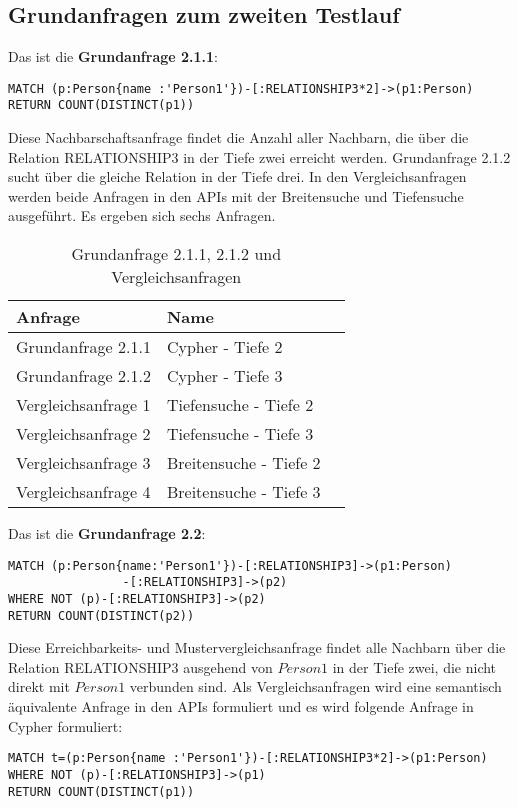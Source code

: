 \subsection{Grundanfragen zum zweiten Testlauf}
Das ist die \textbf{Grundanfrage 2.1.1}: 
\begin{Verbatim}[frame=single]
MATCH (p:Person{name :'Person1'})-[:RELATIONSHIP3*2]->(p1:Person) 
RETURN COUNT(DISTINCT(p1))
\end{Verbatim} 
Diese Nachbarschaftsanfrage findet die Anzahl aller Nachbarn, die über die Relation RELATIONSHIP3 in der Tiefe zwei erreicht werden. Grundanfrage 2.1.2 sucht über die gleiche Relation in der Tiefe drei. In den Vergleichsanfragen werden beide Anfragen in den APIs mit der Breitensuche und Tiefensuche ausgeführt. Es ergeben sich sechs Anfragen.
\FloatBarrier
\begin{table}[h]
	\centering
	\begin{tabular}{ |p{5cm}||p{5cm}|p{3cm}  }
		\hline
		Anfrage& Name\\
		\hline
		Grundanfrage 2.1.1 &  Cypher - Tiefe 2\\
		Grundanfrage 2.1.2 &  Cypher - Tiefe 3\\
		Vergleichsanfrage 1 &  Tiefensuche - Tiefe 2\\
		Vergleichsanfrage 2 &  Tiefensuche - Tiefe 3\\
		Vergleichsanfrage 3 &  Breitensuche - Tiefe 2\\
		Vergleichsanfrage 4 &  Breitensuche - Tiefe 3\\
		\hline
	\end{tabular}
	\caption{Grundanfrage 2.1.1, 2.1.2 und Vergleichsanfragen}
	\label{tab:Intro_Query2_2}
\end{table}
\FloatBarrier
\noindent Das ist die \textbf{Grundanfrage 2.2}: 
\begin{Verbatim}[frame=single]
MATCH (p:Person{name:'Person1'})-[:RELATIONSHIP3]->(p1:Person)
				-[:RELATIONSHIP3]->(p2)
WHERE NOT (p)-[:RELATIONSHIP3]->(p2) 
RETURN COUNT(DISTINCT(p2))
\end{Verbatim} 
Diese Erreichbarkeits- und Mustervergleichsanfrage findet alle Nachbarn über die Relation RELATIONSHIP3 ausgehend von $Person1$ in der Tiefe zwei, die nicht direkt mit $Person1$ verbunden sind. Als Vergleichsanfragen wird eine semantisch äquivalente Anfrage in den APIs formuliert und es wird folgende Anfrage in Cypher formuliert: 
\begin{Verbatim}[frame=single]
MATCH t=(p:Person{name :'Person1'})-[:RELATIONSHIP3*2]->(p1:Person)
WHERE NOT (p)-[:RELATIONSHIP3]->(p1)
RETURN COUNT(DISTINCT(p1))
\end{Verbatim}
